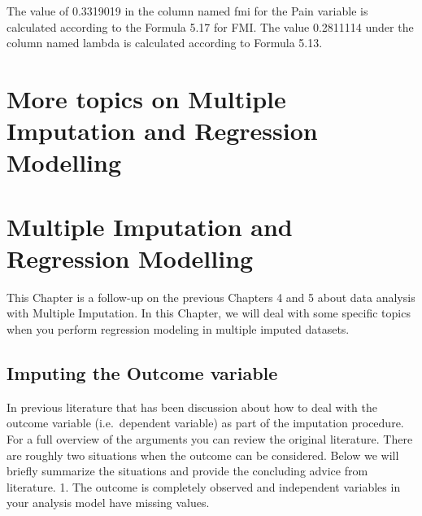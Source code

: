 \documentclass[]{book}
\newenvironment{Shaded}{\begin{snugshade}}{\end{snugshade}}
\newcommand{\CommentTok}[1]{\textcolor[rgb]{0.56,0.35,0.01}{\textit{#1}}}
\begin{document}
\begin{Shaded}
\end{Shaded}

The value of 0.3319019 in the column named fmi for the Pain variable is
calculated according to the Formula 5.17 for FMI. The value 0.2811114
under the column named lambda is calculated according to Formula 5.13.

\chapter{More topics on Multiple Imputation and Regression
Modelling}\label{more-topics-on-multiple-imputation-and-regression-modelling}

\chapter{Multiple Imputation and Regression
Modelling}\label{multiple-imputation-and-regression-modelling}

This Chapter is a follow-up on the previous Chapters 4 and 5 about data
analysis with Multiple Imputation. In this Chapter, we will deal with
some specific topics when you perform regression modeling in multiple
imputed datasets.

\section{Imputing the Outcome
variable}\label{imputing-the-outcome-variable}

In previous literature that has been discussion about how to deal with
the outcome variable (i.e.~dependent variable) as part of the imputation
procedure. For a full overview of the arguments you can review the
original literature. There are roughly two situations when the outcome
can be considered. Below we will briefly summarize the situations and
provide the concluding advice from literature. 1. The outcome is
completely observed and independent variables in your analysis model
have missing values.
\end{document}
